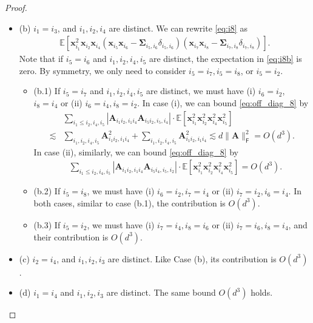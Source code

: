 \documentclass[twoside,11pt]{article}
\newcommand{\E}{\mathbb{E}}
\def\bA{{\boldsymbol A}}
\def\bx{{\boldsymbol x}}
\def\bSigma{{\boldsymbol \Sigma}}
\newcommand{\1}{\mathbf{1}}
\def\msf{\mathsf}
\begin{document}
\begin{proof}
\begin{enumerate}
\begin{itemize}
        \item (b) $i_1=i_3$, and $i_1,i_2,i_4$ are distinct. We can rewrite \eqref{eq:i8} as 
        \begin{align}\label{eq:i8b}
            \E[\bx_{i_1}^2\bx_{i_2}\bx_{i_4}(\bx_{i_5}\bx_{i_6}-\bSigma_{i_5,i_6}\delta_{i_5,i_6})(\bx_{i_7}\bx_{i_8}-\bSigma_{i_7,i_8}\delta_{i_7,i_8})].
        \end{align}
   Note that if $i_5=i_6$ and $i_1,i_2,i_4,i_5$ are distinct, the expectation in \eqref{eq:i8b} is zero. By symmetry, we only need to consider $i_5=i_7, i_5=i_8$, or $i_5=i_2$.
     \begin{itemize}
         \item  (b.1) If $i_5=i_7$ and $i_1,i_2,i_4,i_5$ are distinct, we must have (i) $i_6=i_2$, $i_8=i_4$ or (ii) $i_6=i_4, i_8=i_2$. In case (i), we can bound \eqref{eq:off_diag_8} by 
        \begin{align}
            &\sum_{i_1\leq i_2, i_4, i_5} |\bA_{i_1i_2,i_1i_4}\bA_{i_5i_2, i_5,i_4}|\cdot \E[\bx_{i_1}^2\bx_{i_2}^2\bx_{i_4}^2\bx_{i_5}^2]\\
            \lesssim  &\sum_{i_1,i_2,i_4,i_5}\bA_{i_1i_2,i_1i_4}^2 +\sum_{i_1,i_2,i_4,i_5}\bA_{i_1i_2,i_1i_4}^2\lesssim d\|\bA\|_{\msf F}^2=O(d^3).
        \end{align}
        In case (ii), similarly, we can bound \eqref{eq:off_diag_8} by 
        \begin{align}
            &\sum_{i_1\leq i_2, i_4, i_5} |\bA_{i_1i_2,i_1i_4}\bA_{i_5i_4, i_5,i_2}|\cdot \E[\bx_{i_1}^2\bx_{i_2}^2\bx_{i_4}^2\bx_{i_5}^2]=O(d^3).
        \end{align}
        \item (b.2) If $i_5=i_8$, we must have (i) $i_6=i_2, i_7=i_4$ or (ii) $i_7=i_2, i_6=i_4$. In both cases, similar to case (b.1), the contribution is $O(d^3)$. 
        \item (b.3) If $i_5=i_2$, we must have (i) $i_7=i_4,i_8=i_6$ or (ii) $i_7=i_6, i_8=i_4$, and their contribution is $O(d^3)$.
     \end{itemize}
    
      
        
        \item (c) $i_2=i_4$, and $i_1,i_2,i_3$ are distinct. Like Case (b), its contribution is $O(d^3)$.
    \item (d) $i_1=i_4$ and $i_1,i_2,i_3$ are distinct. The same bound $O(d^3)$ holds.
    \end{itemize}
    



\end{enumerate}
\end{proof}
\end{document}
